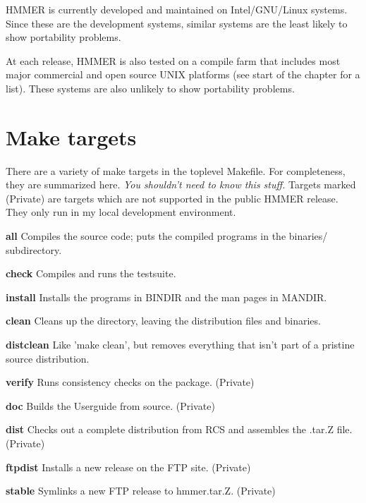 HMMER is currently developed and maintained on Intel/GNU/Linux
systems. Since these are the development systems, similar systems are
the least likely to show portability problems.

At each release, HMMER is also tested on a compile farm that includes
most major commercial and open source UNIX platforms (see start of the
chapter for a list).  These systems are also unlikely to show
portability problems.

\section{Make targets}

There are a variety of make targets in the toplevel Makefile.  For
completeness, they are summarized here. \textit{You shouldn't need to
know this stuff.} Targets marked (Private) are targets which are not
supported in the public HMMER release. They only run in my local
development environment.

\begin{wideitem}
\item[\textbf{all}]  Compiles the source code; puts the compiled
programs in the binaries/ subdirectory.
 
\item[\textbf{check}]  Compiles and runs the testsuite.

\item[\textbf{install}] Installs the programs in BINDIR and
the man pages in MANDIR.

\item[\textbf{clean}] Cleans up the directory, leaving the
distribution files and binaries.

\item[\textbf{distclean}] Like 'make clean', but removes everything
that isn't part of a pristine source distribution.

\item[\textbf{verify}] Runs consistency checks on the package.
(Private)

\item[\textbf{doc}] Builds the Userguide from \latex source. (Private)

\item[\textbf{dist}] Checks out a complete distribution from RCS
and assembles the .tar.Z file. (Private)

\item[\textbf{ftpdist}] Installs a new release on the FTP
site. (Private)

\item[\textbf{stable}] Symlinks a new FTP release to hmmer.tar.Z. (Private)

\end{wideitem}







